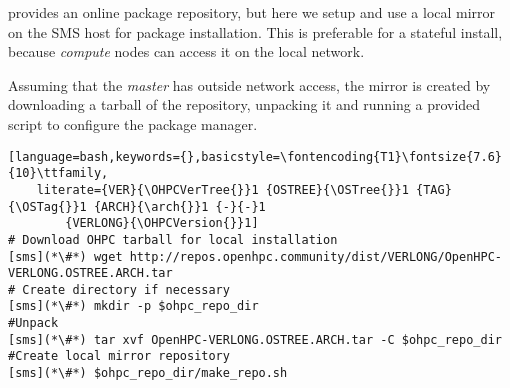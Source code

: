 \OHPC{} provides an online package repository, but here we setup and use a local
mirror on the SMS host for \OHPC{} package installation. This is preferable for
a stateful install, because {\em compute} nodes can access it on the local
network.  


Assuming that the {\em master} has outside network access, the mirror is
created  by downloading a tarball of the repository, unpacking it and running a
provided script to configure the package manager.

\begin{lstlisting}[language=bash,keywords={},basicstyle=\fontencoding{T1}\fontsize{7.6}{10}\ttfamily,
	literate={VER}{\OHPCVerTree{}}1 {OSTREE}{\OSTree{}}1 {TAG}{\OSTag{}}1 {ARCH}{\arch{}}1 {-}{-}1 
        {VERLONG}{\OHPCVersion{}}1]
# Download OHPC tarball for local installation
[sms](*\#*) wget http://repos.openhpc.community/dist/VERLONG/OpenHPC-VERLONG.OSTREE.ARCH.tar
# Create directory if necessary
[sms](*\#*) mkdir -p $ohpc_repo_dir
#Unpack
[sms](*\#*) tar xvf OpenHPC-VERLONG.OSTREE.ARCH.tar -C $ohpc_repo_dir
#Create local mirror repository
[sms](*\#*) $ohpc_repo_dir/make_repo.sh
\end{lstlisting}
